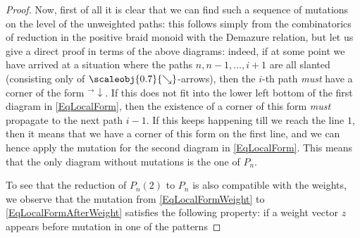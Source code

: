 \documentclass[11pt, reqno]{amsart}
\theoremstyle{definition}
\numberwithin{equation}{section}
\newcommand{\sears}{\scaleobj{0.7}{\searrow}}
\begin{document}
\begin{proof}
Now, first of all it is clear that we can find such a sequence of mutations on the level of the unweighted paths: this follows simply from the combinatorics of reduction in the positive braid monoid with the Demazure relation, but let us give a direct proof in terms of the above diagrams: indeed, if at some point we have arrived at a situation where the paths $n,n-1, \ldots, i+1$ are all slanted (consisting only of $\sears$-arrows), then the $i$-th path \emph{must} have a corner of the form ${}^{\rightarrow} \!\!\!\downarrow$. If this does not fit into the lower left bottom of the first diagram in \eqref{EqLocalForm}, then the existence of a corner of this form \emph{must} propagate to the next path $i-1$. If this keeps happening till we reach the line $1$, then it means that we have a corner of this form on the first line, and we can hence apply the mutation for the second diagram in \eqref{EqLocalForm}. This means that the only diagram without mutations is the one of $P_n$. 

To see that the reduction of $P_n(2)$ to $P_n$ is also compatible with the weights, we observe that the mutation from \eqref{EqLocalFormWeight} to  \eqref{EqLocalFormAfterWeight} satisfies the following property: if a weight vector $z$ appears before mutation in one of the patterns


\end{proof}
\end{document}
